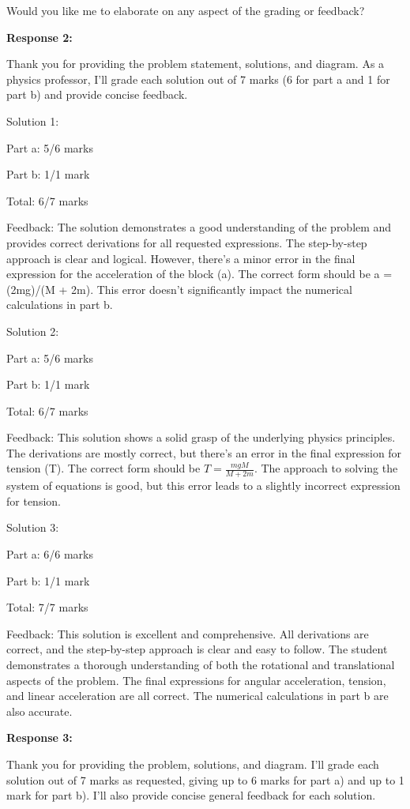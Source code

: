 \documentclass[a4paper,11pt]{article}
\begin{document}
Would you like me to elaborate on any aspect of the grading or feedback?

\bigskip
\textbf{Response 2:}

Thank you for providing the problem statement, solutions, and diagram. As a physics professor, I'll grade each solution out of 7 marks (6 for part a and 1 for part b) and provide concise feedback.

Solution 1:

Part a: 5/6 marks

Part b: 1/1 mark

Total: 6/7 marks

Feedback: The solution demonstrates a good understanding of the problem and provides correct derivations for all requested expressions. The step-by-step approach is clear and logical. However, there's a minor error in the final expression for the acceleration of the block (a). The correct form should be a = (2mg)/(M + 2m). This error doesn't significantly impact the numerical calculations in part b.

Solution 2:

Part a: 5/6 marks

Part b: 1/1 mark

Total: 6/7 marks

Feedback: This solution shows a solid grasp of the underlying physics principles. The derivations are mostly correct, but there's an error in the final expression for tension (T). The correct form should be \(T = \frac{mgM}{M + 2m}\). The approach to solving the system of equations is good, but this error leads to a slightly incorrect expression for tension.

Solution 3:

Part a: 6/6 marks

Part b: 1/1 mark

Total: 7/7 marks

Feedback: This solution is excellent and comprehensive. All derivations are correct, and the step-by-step approach is clear and easy to follow. The student demonstrates a thorough understanding of both the rotational and translational aspects of the problem. The final expressions for angular acceleration, tension, and linear acceleration are all correct. The numerical calculations in part b are also accurate.

\bigskip
\textbf{Response 3:}

Thank you for providing the problem, solutions, and diagram. I'll grade each solution out of 7 marks as requested, giving up to 6 marks for part a) and up to 1 mark for part b). I'll also provide concise general feedback for each solution.
\end{document}
